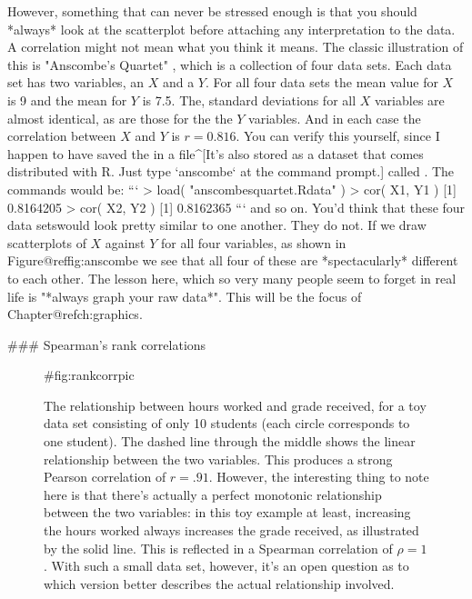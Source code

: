 However, something that can never be stressed enough is that you should *always* look at the scatterplot before attaching any interpretation to the data. A correlation might not mean what you think it means. The classic illustration of this is "Anscombe's Quartet" \cite{Anscombe1973}, which is a collection of four data sets. Each data set has two variables, an $X$ and a $Y$. For all four data sets the mean value for $X$ is 9 and the mean for $Y$ is 7.5. The, standard deviations for all $X$ variables are almost identical, as are those for the the $Y$ variables. And in each case the correlation between $X$ and $Y$ is $r = 0.816$. You can verify this yourself, since I happen to have saved the in a file^[It's also stored as a dataset that comes distributed with R. Just type `anscombe` at the command prompt.] called . The commands would be:
```
> load( "anscombesquartet.Rdata" )
> cor( X1, Y1 )
[1] 0.8164205
> cor( X2, Y2 )
[1] 0.8162365
```
and so on. 
You'd think that these four data setswould look pretty similar to one another. They do not. If we draw scatterplots of $X$ against $Y$ for all four variables, as shown in Figure@reffig:anscombe we see that all four of these are *spectacularly* different to each other. The lesson here, which so very many people seem to forget in real life is "*always graph your raw data*". This will be the focus of Chapter@refch:graphics.





### Spearman's rank correlations

\begin{figure}[t]
\begin{center}
\end{center}
\caption{The relationship between hours worked and grade received, for a toy data set consisting of only 10 students (each circle corresponds to one student). The dashed line through the middle shows the linear relationship between the two variables. This produces a strong Pearson correlation of $r = .91$. However, the interesting thing to note here is that there's actually a perfect monotonic relationship between the two variables: in this toy example at least, increasing the hours worked always increases the grade received, as illustrated by the solid line. This is reflected in a Spearman correlation of $\rho = 1$. With such a small data set, however, it's an open question as to which version better describes the actual relationship involved. }
\HR
{#fig:rankcorrpic}
\end{figure}

